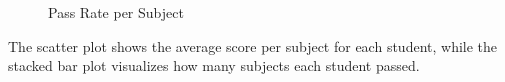 \documentclass[11pt]{report}
\begin{document}
\dataA


\begin{figure}[H]
  \centering
    \plot{\dataA}
  \vspace{1em}
  \centering
  \caption{ Pass Rate per Subject }
\end{figure}


The scatter plot shows the average score per subject for each student, while the stacked bar plot visualizes how many subjects each student passed.
\end{document}
